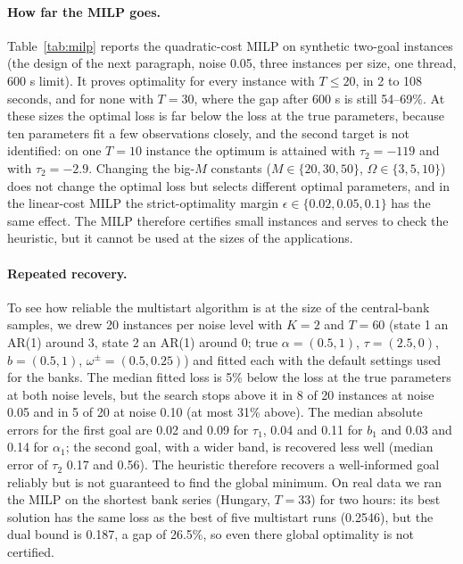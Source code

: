 \documentclass[pdflatex,sn-basic]{sn-jnl}
\theoremstyle{thmstyleone}\newtheorem{proposition}{Proposition}\newtheorem{theorem}{Theorem}
\theoremstyle{thmstylethree}\newtheorem{remark}{Remark}
\begin{document}
\paragraph{How far the MILP goes.} Table~\ref{tab:milp} reports the quadratic-cost MILP on synthetic two-goal instances (the design of the next paragraph, noise 0.05, three instances per size, one thread, 600 s limit). It proves optimality for every instance with $T\le20$, in 2 to 108 seconds, and for none with $T=30$, where the gap after 600 s is still 54--69\%. At these sizes the optimal loss is far below the loss at the true parameters, because ten parameters fit a few observations closely, and the second target is not identified: on one $T=10$ instance the optimum is attained with $\tau_2=-119$ and with $\tau_2=-2.9$. Changing the big-$M$ constants ($M\in\{20,30,50\}$, $\Omega\in\{3,5,10\}$) does not change the optimal loss but selects different optimal parameters, and in the linear-cost MILP the strict-optimality margin $\epsilon\in\{0.02,0.05,0.1\}$ has the same effect. The MILP therefore certifies small instances and serves to check the heuristic, but it cannot be used at the sizes of the applications.
\begin{table}[t]\centering\small
\caption{Quadratic-cost MILP on synthetic two-goal instances (noise 0.05, three instances per $T$, 600 s limit). Gap: relative gap between incumbent and dual bound at termination.}\label{tab:milp}\end{table}
\paragraph{Repeated recovery.} To see how reliable the multistart algorithm is at the size of the central-bank samples, we drew 20 instances per noise level with $K=2$ and $T=60$ (state 1 an AR(1) around 3, state 2 an AR(1) around 0; true $\alpha=(0.5,1)$, $\tau=(2.5,0)$, $b=(0.5,1)$, $\omega^\pm=(0.5,0.25)$) and fitted each with the default settings used for the banks. The median fitted loss is 5\% below the loss at the true parameters at both noise levels, but the search stops above it in 8 of 20 instances at noise 0.05 and in 5 of 20 at noise 0.10 (at most 31\% above). The median absolute errors for the first goal are 0.02 and 0.09 for $\tau_1$, 0.04 and 0.11 for $b_1$ and 0.03 and 0.14 for $\alpha_1$; the second goal, with a wider band, is recovered less well (median error of $\tau_2$ 0.17 and 0.56). The heuristic therefore recovers a well-informed goal reliably but is not guaranteed to find the global minimum. On real data we ran the MILP on the shortest bank series (Hungary, $T=33$) for two hours: its best solution has the same loss as the best of five multistart runs (0.2546), but the dual bound is 0.187, a gap of 26.5\%, so even there global optimality is not certified.
\end{document}
